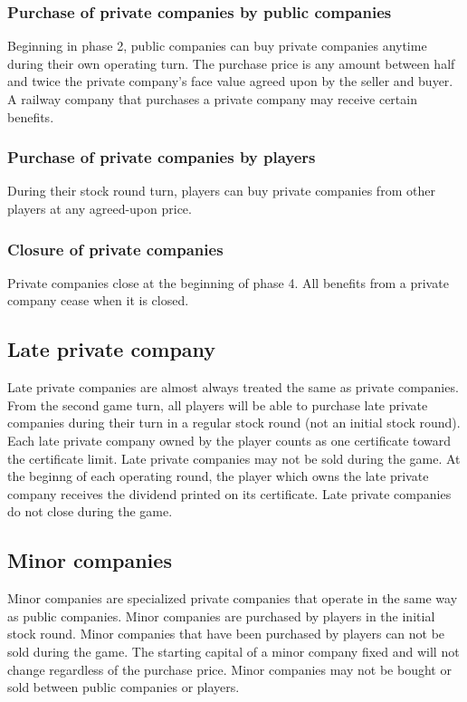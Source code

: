 \documentclass{article}
\begin{document}
\begin{CJK}{UTF8}{min}
\begin{multicols}{2}
\subsubsection{Purchase of private companies by public companies}
Beginning in phase 2, public companies can buy private companies
anytime during their own operating turn. The purchase price is any
amount between half and twice the private company's face value agreed
upon by the seller and buyer.  A railway company that purchases a
private company may receive certain benefits.

\subsubsection{Purchase of private companies by players}
During their stock round turn, players can buy private companies from
other players at any agreed-upon price.

\subsubsection{Closure of private companies}
Private companies close at the beginning of phase 4. All benefits from
a private company cease when it is closed.

\subsection{Late private company}
Late private companies are almost always treated the same as private
companies. From the second game turn, all players will be able to
purchase late private companies during their turn in a regular stock
round (not an initial stock round). Each late private company owned by
the player counts as one certificate toward the certificate
limit. Late private companies may not be sold during the game. At the
beginng of each operating round, the player which owns the late
private company receives the dividend printed on its certificate. Late
private companies do not close during the game.

\subsection{Minor companies}
Minor companies are specialized private companies that operate in the
same way as public companies. Minor companies are purchased by players
in the initial stock round. Minor companies that have been purchased
by players can not be sold during the game. The starting capital of a
minor company fixed and will not change regardless of the purchase
price. Minor companies may not be bought or sold between public
companies or players.


\end{multicols}
\end{CJK}
\end{document}
